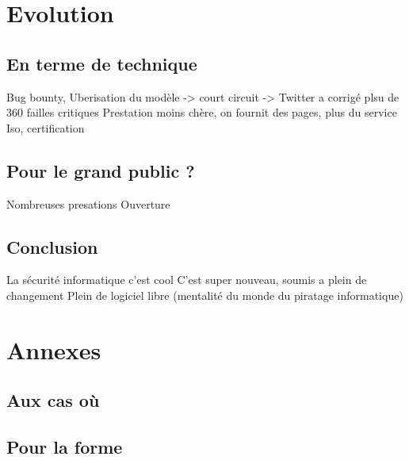 \documentclass[a4paper]{memoir}
\begin{document}
\part{Evolution}

\chapter{En terme de technique}

Bug bounty, Uberisation du modèle -> court circuit -> Twitter a corrigé plsu de 360 failles critiques 
Prestation moins chère, on fournit des pages, plus du service
Iso, certification

\chapter{Pour le grand public ?}

Nombreuses presations
Ouverture



\chapter*{Conclusion}

La sécurité informatique c'est cool
C'est super nouveau, soumis a plein de changement
Plein de logiciel libre (mentalité du monde du piratage informatique)


\part*{Annexes}
\appendix

\chapter{Aux cas où}

\chapter{Pour la forme}


\backmatter%

\nocite{*}



\printindex
\end{document}

